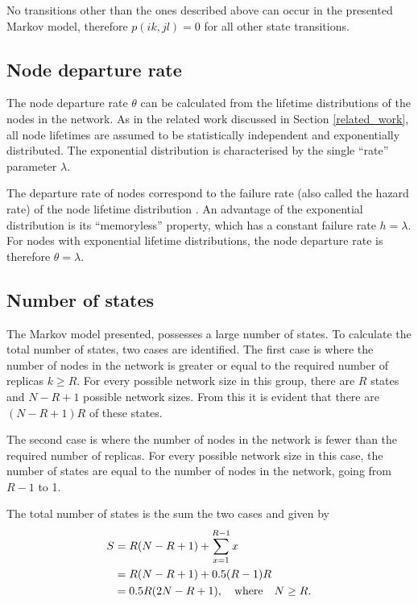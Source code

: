 No transitions other than the ones described above can occur in the presented Markov model, therefore $p(i k,j l) = 0$ for all other state transitions.

\subsection{Node departure rate}
\label{node_departure_rate}

The node departure rate $\theta$ can be calculated from the lifetime distributions of the nodes in the network. As in the related work discussed in Section \ref{related_work}, all node lifetimes are assumed to be statistically independent and exponentially distributed. The exponential distribution is characterised by the single ``rate'' parameter $\lambda$.

The departure rate of nodes correspond to the failure rate (also called the hazard rate) of the node lifetime distribution \cite{rausand2004systemreliability}. An advantage of the exponential distribution is its ``memoryless'' property, which has a constant failure rate $h = \lambda$. For nodes with exponential lifetime distributions, the node departure rate is therefore $\theta = \lambda$.

\subsection{Number of states}

The Markov model presented, possesses a large number of states. To calculate the total number of states, two cases are identified. The first case is where the number of nodes in the network is greater or equal to the required number of replicas $k \geq R$. For every possible network size in this group, there are $R$ states and $N - R + 1$ possible network sizes. From this it is evident that there are $(N - R + 1)R$ of these states.

The second case is where the number of nodes in the network is fewer than the required number of replicas. For every possible network size in this case, the number of states are equal to the number of nodes in the network, going from $R-1$ to 1.

The total number of states is the sum the two cases and given by
%
\begin{align}
       S & = R(N - R + 1) + \sum_{x=1}^{R-1} x\label{eq_states_num_init}\\
         & = R(N - R + 1) + 0.5 (R - 1) R\notag\\
         & = 0.5 R (2 N - R + 1), \quad\textrm{where}\quad N \geq R. \label{eq_states_num_ans}
\end{align}

